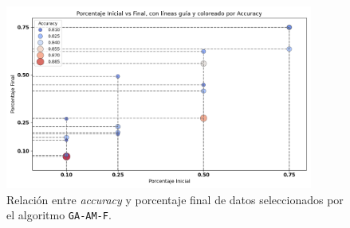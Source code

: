 \begin{figure}[htp]
    \centering
    \includegraphics[width=0.9\textwidth]{imagenes/evaluaciones/libres/scatter_ga-am-f.png}
    \caption{Relación entre \textit{accuracy} y porcentaje final de datos seleccionados por el algoritmo \texttt{GA-AM-F}.}
    \label{fig:scatter_gen_v2}
\end{figure}

